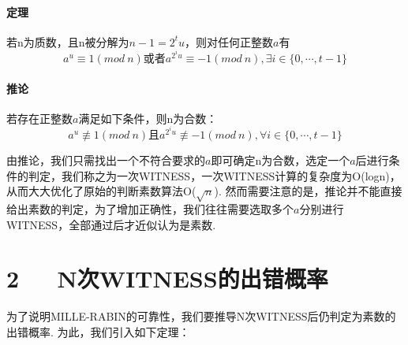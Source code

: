 \documentclass[UTF8]{ctexart}
\begin{document}
\paragraph*{定理}若n为质数，且n被分解为$n-1=2^tu$，则对任何正整数$a$有
\begin{equation} a^u\equiv 1(mod\ n) \text{或者}a^{2^iu}\equiv -1(mod\ n),\exists i\in\{0, \cdots,t-1\}\end{equation}
\paragraph*{推论}若存在正整数$a$满足如下条件，则n为合数：
\begin{equation} a^u \not\equiv 1(mod\ n) \text{且}a^{2^iu}\not\equiv -1(mod\ n),\forall i\in\{0, \cdots,t-1\}\end{equation}\par
由推论，我们只需找出一个不符合要求的$a$即可确定n为合数，选定一个$a$后进行条件的判定，我们称之为一次WITNESS，一次WITNESS计算的复杂度为O(logn)，从而大大优化了原始的判断素数算法O($\sqrt{n}$). 然而需要注意的是，推论并不能直接给出素数的判定，为了增加正确性，我们往往需要选取多个$a$分别进行WITNESS，全部通过后才近似认为是素数.

\section*{2\ \ \ N次WITNESS的出错概率}
为了说明MILLE-RABIN的可靠性，我们要推导N次WITNESS后仍判定为素数的出错概率. 为此，我们引入如下定理：
\end{document}
